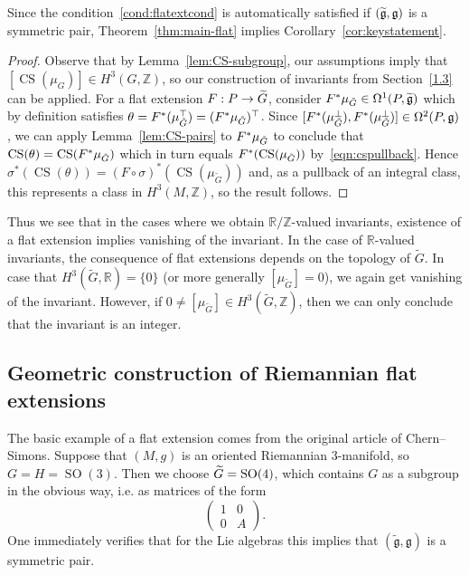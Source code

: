\documentclass[AHL,Unicode,longabstracts]{cedram}
\renewcommand{\o}{\circ}
\renewcommand{\th}{\theta}
\newcommand{\si}{\sigma}
\newcommand{\Om}{\Omega}
\DeclareMathOperator{\CS}{CS}
\DeclareMathOperator{\SO}{SO}
\newcommand*{\R}{\mathbb{R}}
\newcommand{\Z}{\mathbb{Z}}
\newcommand{\tfg}{\widetilde{\mathfrak g}}
\newcommand{\fkg}{\mathfrak{g}}
\renewcommand*{\to}{\mathchoice{\longrightarrow}{\rightarrow}{\rightarrow}{\rightarrow}}
\let\oldtilde\tilde
\renewcommand*{\tilde}[1]{\mathchoice{\widetilde{#1}}{\widetilde{#1}}{\oldtilde{#1}}{\oldtilde{#1}}}
\newcommand*{\R}{\mathbb{R}}
\begin{document}
\begin{rema}
Since the condition~\eqref{cond:flatextcond} is automatically satisfied if $(\tilde{\fkg},\fkg)$ is a symmetric pair, Theorem~\ref{thm:main-flat} implies Corollary~\ref{cor:keystatement}.
\end{rema}

\begin{proof}
Observe that by Lemma~\ref{lem:CS-subgroup}, our assumptions imply that $[\CS(\mu_G)]\in H^3(G,\Z)$, so our construction of invariants from Section~\ref{1.3} can be applied. For a flat extension $F: P\to \tilde G$, consider $F^*\mu_{\tilde G}\in\Om^1(P,\tfg)$ which by definition satisfies $\theta=F^*(\mu_{\tilde{G}}^\top)=(F^*\mu_{\tilde G})^\top$. Since $[F^*(\mu_{\tilde G}^\perp),F^*(\mu_{\tilde G}^\perp)]\in\Om^2(P,\fkg)$, we can apply Lemma~\ref{lem:CS-pairs} to $F^*\mu_{\tilde G}$ to conclude that $\CS(\th)=\CS(F^*\mu_{\tilde G})$ which in turn equals $F^*(\CS(\mu_{\tilde G}))$ by~\eqref{eqn:cspullback}. Hence $\si^*(\CS(\theta))=(F\o\si)^*(\CS(\mu_{\widetilde{G}}))$ and, as a pullback of an integral class, this represents a class in $H^3(M,\Z)$, so the result follows.
\end{proof}

Thus we see that in the cases where we obtain $\R/\Z$-valued invariants, existence of a flat extension implies vanishing of the invariant. In the case of $\R$-valued invariants, the consequence of flat extensions depends on the topology of $\widetilde{G}$. In case that $H^3(\widetilde{G},\R)=\{0\}$ (or more generally $[\mu_{\widetilde{G}}]=0$), we again get vanishing of the invariant. However, if $0\neq [\mu_{\widetilde{G}}]\in H^3(\widetilde{G},\Z)$, then we can only conclude that the invariant is an integer.

\subsection{Geometric construction of Riemannian flat extensions}\label{1.6}

The basic example of a flat extension comes from the original article of Chern--Simons. Suppose that $(M,g)$ is an oriented Riemannian $3$-manifold, so $G=H=\SO(3)$. Then we choose $\tilde G=\SO(4)$, which contains $G$ as a subgroup in the obvious way, i.e. as matrices of the form
\[
\begin{pmatrix}
1 & 0
\\ 0 & A
\end{pmatrix}.
\]
One immediately verifies that for the Lie algebras this implies that $(\tfg,\fkg)$ is a symmetric pair.
\end{document}
